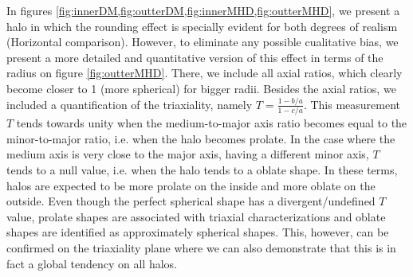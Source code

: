 In figures \ref{fig:innerDM,fig:outterDM,fig:innerMHD,fig:outterMHD}, we present a halo in which the rounding effect is specially evident for both degrees of realism (Horizontal comparison). However, to eliminate any possible cualitative bias, we present a more detailed and quantitative version of this effect in terms of the radius on figure \ref{fig:outterMHD}. There, we include all axial ratios, which clearly become closer to 1 (more spherical) for bigger radii. Besides the axial ratios, we included a quantification of the triaxiality, namely $T=\frac{1-b/a}{1-c/a}$. This measurement $T$ tends towards unity when the medium-to-major axis ratio becomes equal to the minor-to-major ratio, i.e. when the halo becomes prolate. In the case where the medium axis is very close to the major axis, having a different minor axis, $T$ tends to a null value, i.e. when the halo tends to a oblate shape. In these terms, halos are expected to be more prolate on the inside and more oblate on the outside. Even though the perfect spherical shape has a divergent/undefined $T$ value, prolate shapes are associated with triaxial characterizations and oblate shapes are identified as approximately spherical shapes. This, however, can be confirmed on the triaxiality plane where we can also demonstrate that this is in fact a global tendency on all halos.\\


